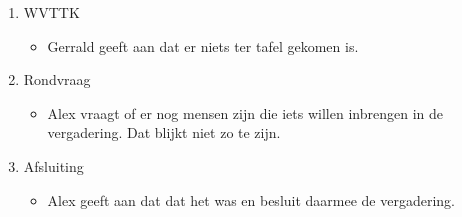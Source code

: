 \begin{enumerate}
    \item WVTTK 
    \begin{itemize}
        \item Gerrald geeft aan dat er niets ter tafel gekomen is.
    \end{itemize}
    \item Rondvraag 
    \begin{itemize}
        \item Alex vraagt of er nog mensen zijn die iets willen inbrengen in de vergadering. Dat blijkt niet zo te zijn.
    \end{itemize}
    \item Afsluiting 
    \begin{itemize}
        \item Alex geeft aan dat dat het was en besluit daarmee de vergadering.
    \end{itemize}
\end{enumerate}
